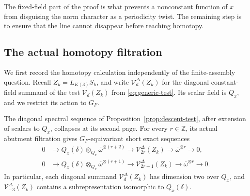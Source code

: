 The fixed-field part of the proof is what prevents a nonconstant function
of \(x\) from disguising the norm character as a periodicity twist. The
remaining step is to ensure that the line cannot disappear before reaching
homotopy.

\subsection{The actual homotopy filtration}

We first record the homotopy calculation independently of the
finite-assembly question. Recall \(Z_k=L_{K(3)}S_k\), and write
\(\mathcal V_d^\Delta(Z_k)\) for the diagonal constant-field summand of
the test \(\mathcal V_d(Z_k)\) from \eqref{eq:generic-test}.
Its scalar field is \(Q_x\), and we restrict its action to \(G_F\).

\begin{proposition}
\label{prop:generic-homotopy}
The diagonal spectral sequence of Proposition~\ref{prop:descent-test},
after extension of scalars to \(Q_x\), collapses at its second page.
For every \(r\in\mathbb Z\), its actual abutment filtration gives
\(G_F\)-equivariant short exact sequences
\begin{align}
 0&\longrightarrow
 Q_x(\delta)\otimes_{Q_x}\overline\omega^{\otimes(r+2)}
 \longrightarrow\mathcal V_{2r}^\Delta(Z_k)
 \longrightarrow\overline\omega^{\otimes r}\longrightarrow0,
 \label{eq:generic-even-filtration}\\
 0&\longrightarrow
 Q_x(\delta)\otimes_{Q_x}\overline\omega^{\otimes(r+1)}
 \longrightarrow\mathcal V_{2r-1}^\Delta(Z_k)
 \longrightarrow\overline\omega^{\otimes r}\longrightarrow0.
 \label{eq:generic-odd-filtration}
\end{align}
In particular, each diagonal summand \(\mathcal V_d^\Delta(Z_k)\) has
dimension two over \(Q_x\), and \(\mathcal V_{-3}^\Delta(Z_k)\) contains
a subrepresentation isomorphic to \(Q_x(\delta)\).
\end{proposition}

